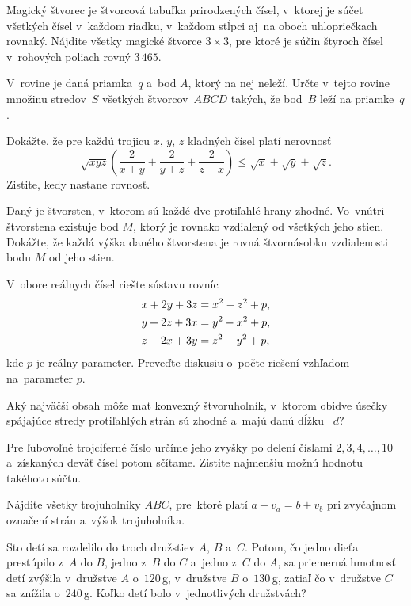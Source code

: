 {%
Magický štvorec je štvorcová tabuľka prirodzených čísel, v~ktorej je
súčet všetkých čísel v~každom riadku, v~každom stĺpci aj~na oboch
uhlopriečkach rovnaký. Nájdite všetky magické štvorce $3\times3$,
pre ktoré je súčin štyroch čísel v~rohových poliach rovný $3\,465$.}

{%
V~rovine je daná priamka~$q$ a~bod $A$, ktorý na nej neleží.
Určte v~tejto rovine množinu stredov~$S$ všetkých štvorcov~$ABCD$
takých, že bod~$B$ leží na priamke~$q$.}

{%
Dokážte, že pre každú trojicu $x$, $y$, $z$ kladných
čísel platí nerovnosť
$$
\sqrt{xyz}\left(\frac{2}{x+y}+\frac{2}{y+z}+\frac{2}{z+x}\right)
\le \sqrt{x}+\sqrt{y}+\sqrt{z}.
$$
Zistite, kedy nastane rovnosť.}

{%
Daný je štvorsten, v~ktorom sú každé dve protiľahlé hrany zhodné.
Vo~vnútri štvorstena existuje bod $M$, ktorý je rovnako vzdialený od
všetkých jeho stien. Dokážte, že každá výška daného štvorstena je
rovná štvornásobku vzdialenosti bodu $M$ od jeho stien.}

{%
V~obore reálnych čísel riešte sústavu rovníc
$$
\aligned
x+2y+3z&=x^2-z^2+p,\\
y+2z+3x&=y^2-x^2+p,\\
z+2x+3y&=z^2-y^2+p,\\
\endaligned
$$
kde $p$ je reálny parameter. Preveďte diskusiu o~počte riešení
vzhľadom na~parameter $p$.}

{%
Aký najväčší obsah môže mať konvexný štvoruholník, v~ktorom obidve
úsečky spájajúce stredy protiľahlých strán sú zhodné a~majú
danú dĺžku~ $d$?}

{%
Pre ľubovoľné trojciferné číslo určíme jeho
zvyšky po delení číslami $2, 3, 4, \dots, 10$ a~získaných
deväť čísel potom sčítame. Zistite najmenšiu možnú hodnotu takéhoto
súčtu.}

{%
Nájdite všetky trojuholníky $ABC$, pre~ktoré platí
$a+v_a=b+v_b$ pri zvyčajnom označení strán a~výšok trojuholníka.}

{%
Sto detí sa rozdelilo do troch družstiev $A$, $B$ a~$C$.
Potom, čo jedno dieťa prestúpilo z~$A$ do $B$, jedno z~$B$ do $C$
a~jedno z~$C$ do $A$, sa priemerná hmotnosť detí zvýšila
v~družstve $A$ o~$120$\,g, v~družstve $B$ o~$130$\,g, zatiaľ čo
v~družstve $C$ sa znížila o~$240$\,g. Koľko detí bolo
v~jednotlivých družstvách?}

